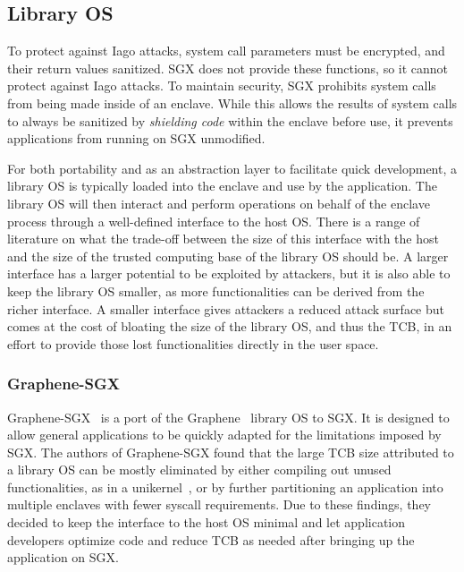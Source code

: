 \documentclass[letterpaper,twocolumn,10pt]{article}
\providecommand{\todo}[1]{{\protect\color{red}\noindent {\bf [TODO]} \emph{#1} {\bf [/TODO]}}}
\begin{document}

\subsection{Library OS}
To protect against Iago attacks, system call parameters must be encrypted, and 
their return values sanitized. SGX does not provide these functions, so it 
cannot protect against Iago attacks.  To maintain security, SGX prohibits system
calls from being made inside of an enclave. While this allows the results of 
system calls to always be sanitized by \emph{shielding code} within the enclave 
before use, it prevents applications from running on SGX unmodified.

For both portability and as an abstraction layer to facilitate quick
development, a library OS is typically loaded into the enclave and
use by the application. The library OS will then interact and perform
operations on behalf of the enclave process through a well-defined interface to
the host OS. There is a range of literature on what the trade-off between the
size of this interface with the host and the size of the trusted
computing base of the library OS should be. A larger interface has a larger
potential to be exploited by attackers, but it is also able to keep the library 
OS smaller, as more functionalities can be derived from the richer interface.
A smaller interface gives attackers a reduced attack surface but comes at the
cost of bloating the size of the library OS, and thus the TCB, in an effort to
provide those lost functionalities directly in the user space.


\subsubsection{Graphene-SGX}
Graphene-SGX~\cite{tsai_graphene-sgx:_2017} is a port of the
Graphene~\cite{tsai_cooperation_2014} library OS to SGX. It is designed to
allow general applications to be quickly adapted for the limitations imposed by
SGX.  The authors of Graphene-SGX found that the large TCB size attributed to a
library OS can be mostly eliminated by either compiling out unused
functionalities, as in a unikernel~\cite{madhavapeddy_unikernels:_2013}, or by further partitioning an application
into multiple enclaves with fewer syscall requirements. Due to these findings,
they decided to keep the interface to the host OS minimal and let application
developers optimize code and reduce TCB as needed after bringing up the
application on SGX.
\end{document}
